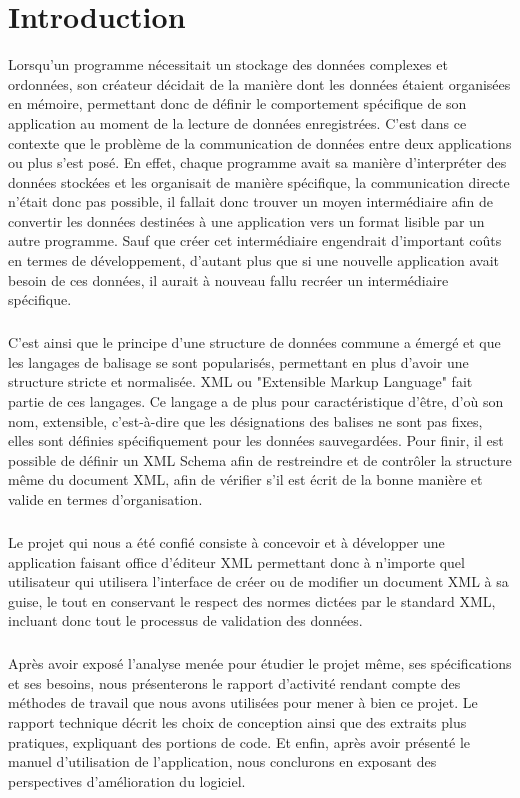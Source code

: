 \chapter{Introduction}

Lorsqu'un programme nécessitait un stockage des données complexes et ordonnées, son créateur décidait de la manière dont les données étaient organisées en mémoire, permettant donc de définir le comportement spécifique de son application au moment de la lecture de données enregistrées. C'est dans ce contexte que le problème de la communication de données entre deux applications ou plus s'est posé. En effet, chaque programme avait sa manière d'interpréter des données stockées et les organisait de manière spécifique, la communication directe n'était donc pas possible, il fallait donc trouver un moyen intermédiaire afin de convertir les données destinées à une application vers un format lisible par un autre programme. Sauf que créer cet intermédiaire engendrait d'important coûts en termes de développement, d'autant plus que si une nouvelle application avait besoin de ces données, il aurait à nouveau fallu recréer un intermédiaire spécifique.
\paragraph{}

C'est ainsi que le principe d'une structure de données commune a émergé et que les langages de balisage se sont popularisés, permettant en plus d'avoir une structure stricte et normalisée. XML ou "Extensible Markup Language" fait partie de ces langages. Ce langage a de plus pour caractéristique d'être, d'où son nom, extensible, c'est-à-dire que les désignations des balises ne sont pas fixes, elles sont définies spécifiquement pour les données sauvegardées. Pour finir, il est possible de définir un XML Schema afin de restreindre et de contrôler la structure même du document XML, afin de vérifier s'il est écrit de la bonne manière et valide en termes d'organisation.
\paragraph{}

Le projet qui nous a été confié consiste à concevoir et à développer une application faisant office d'éditeur XML permettant donc à n'importe quel utilisateur qui utilisera l'interface de créer ou de modifier un document XML à sa guise, le tout en conservant le respect des normes dictées par le standard XML, incluant donc tout le processus de validation des données.
\paragraph{}

Après avoir exposé l'analyse menée pour étudier le projet même, ses spécifications et ses besoins, nous présenterons le rapport d'activité rendant compte des méthodes de travail que nous avons utilisées pour mener à bien ce projet. Le rapport technique décrit les choix de conception ainsi que des extraits plus pratiques, expliquant des portions de code. Et enfin, après avoir présenté le manuel d'utilisation de l'application, nous conclurons en exposant des perspectives d'amélioration du logiciel.